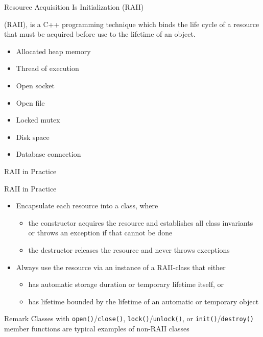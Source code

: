 \begin{frame}{Resource Acquisition Is Initialization (RAII)}{}
  \begin{definition}
     (RAII), is a C++ programming technique which binds the life cycle of a resource that must be acquired before use to the lifetime of an object.
  \end{definition}

  \begin{examples}
    \begin{itemize}
    \item
       Allocated heap memory
    \item
       Thread of execution
    \item
       Open socket
    \item
       Open file
    \item
       Locked mutex
    \item
       Disk space
    \item
       Database connection
    \end{itemize}
  \end{examples}
\end{frame}

\begin{frame}{RAII in Practice}{}
  \begin{block}{RAII in Practice}
    \begin{itemize}
    \item
      Encapsulate each resource into a class, where
      \begin{itemize}
      \item
        the constructor acquires the resource and establishes all class invariants or throws an exception if that cannot be done
      \item
        the destructor releases the resource and never throws exceptions
      \end{itemize}
    \item
      Always use the resource via an instance of a RAII-class that either
      \begin{itemize}
      \item
        has automatic storage duration or temporary lifetime itself, or
      \item
        has lifetime bounded by the lifetime of an automatic or temporary object
      \end{itemize}
    \end{itemize}
  \end{block}

  \begin{block}{Remark}
    Classes with \lstinline!open()!/\lstinline!close()!, \lstinline!lock()!/\lstinline!unlock()!, or \lstinline!init()!/\lstinline!destroy()! member functions are typical examples of non-RAII classes
  \end{block}
\end{frame}


